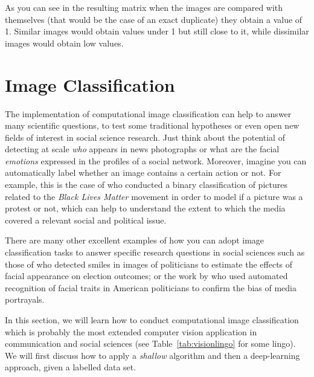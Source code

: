 As you can see in the resulting matrix when the images are compared with themselves (that would be the case of an exact duplicate) they obtain a value of 1. Similar images would obtain values under 1 but still close to it, while dissimilar images would obtain low values.


%

\section{Image Classification}
\label{sec:cnn}

The implementation of computational image classification can help to answer many scientific questions, to test some traditional hypotheses or even open new fields of interest in social science research. Just think about the potential of detecting at scale \textit{who} appears in news photographs or what are the facial \textit{emotions} expressed in the profiles of a social network. Moreover, imagine you can automatically label whether an image contains a certain action or not. For example, this is the case of \citet{williams2020images} who conducted a binary classification of pictures related to the  \textit{Black Lives Matter} movement in order to model if a picture was a protest or not, which can help to understand the extent to which the media covered a relevant social and political issue.

There are many other excellent examples of how you can adopt image classification tasks to answer specific research questions in social sciences such as those of \citet{horiuchi2012should} who detected smiles in images of politicians to estimate the effects of facial appearance on election outcomes; or the work by \citet{peng2018same} who used automated recognition of facial traits in American politicians to confirm the bias of media portrayals.

In this section, we will learn how to conduct computational image classification which is probably the most extended computer vision application in communication and social sciences (see Table~\ref{tab:visionlingo} for some lingo). We will first discuss how to apply a \textit{shallow} algorithm and then a deep-learning approach, given a labelled data set. 	

